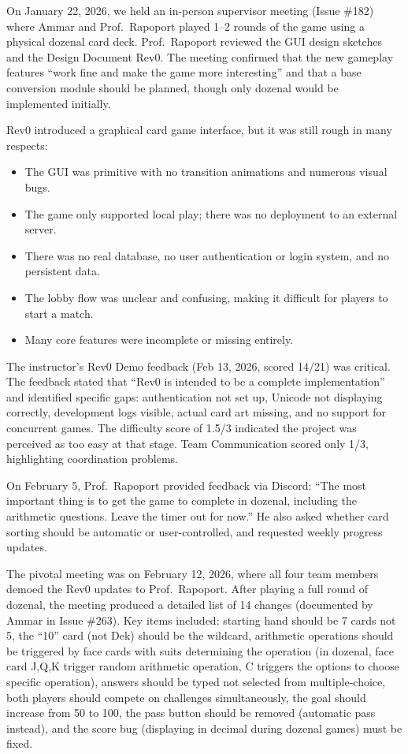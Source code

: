\documentclass{article}
\begin{document}
On January 22, 2026, we held an in-person supervisor meeting (Issue \#182) where Ammar and Prof.\ Rapoport played 1--2 rounds of the game using a physical dozenal card deck. Prof.\ Rapoport reviewed the GUI design sketches and the Design Document Rev0. The meeting confirmed that the new gameplay features ``work fine and make the game more interesting'' and that a base conversion module should be planned, though only dozenal would be implemented initially.

Rev0 introduced a graphical card game interface, but it was still rough in many respects:

\begin{itemize}
  \item The GUI was primitive with no transition animations and numerous visual bugs.
  \item The game only supported local play; there was no deployment to an external server.
  \item There was no real database, no user authentication or login system, and no persistent data.
  \item The lobby flow was unclear and confusing, making it difficult for players to start a match.
  \item Many core features were incomplete or missing entirely.
\end{itemize}

The instructor's Rev0 Demo feedback (Feb 13, 2026, scored 14/21) was critical. The feedback stated that ``Rev0 is intended to be a complete implementation'' and identified specific gaps: authentication not set up, Unicode not displaying correctly, development logs visible, actual card art missing, and no support for concurrent games. The difficulty score of 1.5/3 indicated the project was perceived as too easy at that stage. Team Communication scored only 1/3, highlighting coordination problems.

On February 5, Prof.\ Rapoport provided feedback via Discord: ``The most important thing is to get the game to complete in dozenal, including the arithmetic questions. Leave the timer out for now.'' He also asked whether card sorting should be automatic or user-controlled, and requested weekly progress updates.

The pivotal meeting was on February 12, 2026, where all four team members demoed the Rev0 updates to Prof.\ Rapoport. After playing a full round of dozenal, the meeting produced a detailed list of 14 changes (documented by Ammar in Issue \#263). Key items included: starting hand should be 7 cards not 5, the ``10'' card (not Dek) should be the wildcard, arithmetic operations should be triggered by face cards with suits determining the operation (in dozenal, face card J,Q,K trigger random arithmetic operation, C triggers the options to choose specific operation), answers should be typed not selected from multiple-choice, both players should compete on challenges simultaneously, the goal should increase from 50 to 100, the pass button should be removed (automatic pass instead), and the score bug (displaying in decimal during dozenal games) must be fixed.
\end{document}
